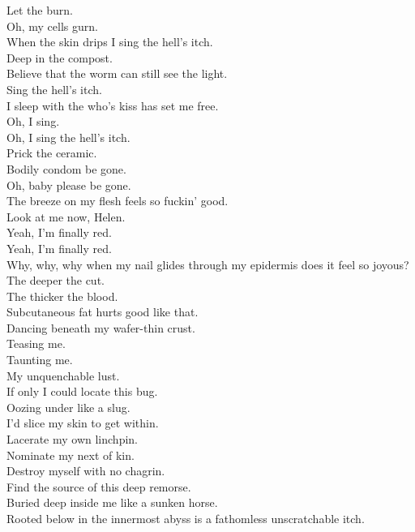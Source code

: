 Let the  burn. \\
Oh, my cells gurn. \\
When the skin drips I sing the hell's itch. \\
Deep in the compost. \\
Believe that the worm can still see the light. \\
Sing the hell's itch. \\
I sleep with the  who's kiss has set me free. \\
Oh, I sing. \\
Oh, I sing the hell's itch. \\
Prick the ceramic. \\
Bodily condom be gone. \\
Oh, baby please be gone. \\
The breeze on my flesh feels so fuckin' good. \\
Look at me now, Helen. \\
Yeah, I'm finally red. \\
Yeah, I'm finally red. \\

Why, why, why when my nail glides through my epidermis does it feel so joyous? \\
The deeper the cut. \\
The thicker the blood. \\
Subcutaneous fat hurts good like that. \\
Dancing beneath my wafer-thin crust. \\
Teasing me. \\
Taunting me. \\
My unquenchable lust. \\
If only I could locate this bug. \\
Oozing under like a slug. \\
I'd slice my skin to get within. \\
Lacerate my own linchpin. \\
Nominate my next of kin. \\
Destroy myself with no chagrin. \\
Find the source of this deep remorse. \\
Buried deep inside me like a sunken horse. \\
Rooted below in the innermost abyss is a fathomless unscratchable itch. \\


